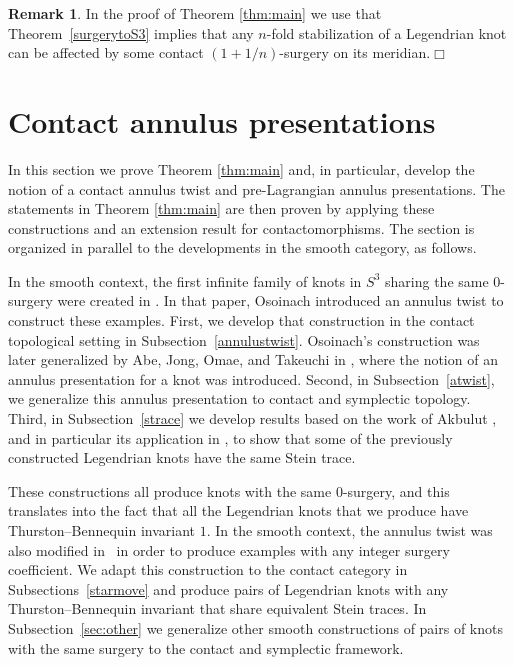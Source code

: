 \documentclass[11pt]{amsart} %
\theoremstyle{plain}
\theoremstyle{definition}
\newtheorem{rem}[Theorem]{Remark}
\begin{document}
\begin{rem}\label{effectstab} In the proof of Theorem \ref{thm:main} we use that Theorem~\ref{surgerytoS3} implies that any $n$-fold stabilization of a Legendrian knot can be affected by some contact $(1+1/n)$-surgery on its meridian.\hfill$\Box$
\end{rem}

\section{Contact annulus presentations}\label{sectionannulustwist}

In this section we prove Theorem \ref{thm:main} and, in particular, develop the notion of a contact annulus twist and pre-Lagrangian annulus presentations. The statements in Theorem \ref{thm:main} are then proven by applying these constructions and an extension result for contactomorphisms. The section is organized in parallel to the developments in the smooth category, as follows.

In the smooth context, the first infinite family of knots in $S^3$ sharing the same $0$-surgery were created in \cite{Osoinach06}. In that paper, Osoinach introduced an annulus twist to construct these examples. First, we develop that construction in the contact topological setting in Subsection~\ref{annulustwist}. Osoinach's construction was later generalized by Abe, Jong, Omae, and Takeuchi in \cite{AbeJongOmaeTakeuchi13}, where the notion of an annulus presentation for a knot was introduced. Second, in Subsection~\ref{atwist}, we generalize this annulus presentation to contact and symplectic topology. Third, in Subsection~\ref{strace} we develop results based on the work of Akbulut \cite{Akbulut77}, and in particular its application in \cite{AbeJongLueckeOsoinach15, AbeJongOmaeTakeuchi13}, to show that some of the previously constructed Legendrian knots have the same Stein trace. 

These constructions all produce knots with the same $0$-surgery, and this translates into the fact that all the Legendrian knots that we produce have Thurston--Bennequin invariant $1$. In the smooth context, the annulus twist was also modified in~\cite{AbeJongLueckeOsoinach15} in order to produce examples with any integer surgery coefficient. We adapt this construction to the contact category in Subsections~\ref{starmove} and produce pairs of Legendrian knots with any Thurston--Bennequin invariant that share equivalent Stein traces. In Subsection~\ref{sec:other} we generalize other smooth constructions of pairs of knots with the same surgery to the contact and symplectic framework. 
\end{document}
